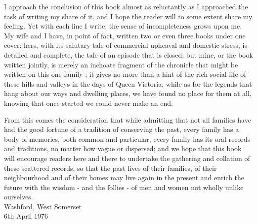 
I approach the conclusion of this book almost as reluctantly as I approached the task of writing my share of it, and I hope the reader will to some extent share my feeling. Yet with each line I write, the sense of incompleteness grows upon me. My wife and I have, in point of fact, written two or even three books under one cover: hers, with its salutary tale of commercial upheaval and domestic stress, is detailed and complete, the tale of an episode that is closed; but mine, or the book written jointly, is merely an inchoate fragment of the chronicle that might be written on this one family ; it gives no more than a hint of the rich social life of these hills and valleys in the days of Queen Victoria; while as for the legends that hang about our ways and dwelling places, we have found no place for them at all, knowing that once started we could never make an end.

From this comes the consideration that while admitting that not all families have had the good fortune of a tradition of conserving the past, every family has a body of memories, both common and particular, every family has its oral records and traditions, no matter how vague or dispersed; and we hope that this book will encourage readers here and there to undertake the gathering and collation of these scattered records, so that the past lives of their families, of their neighbourhood and of their homes may live again in the present and enrich the future with the wisdom - and the follies - of men and women not wholly unlike ourselves. \\

Washford, West Somerset \\
6th April 1976
